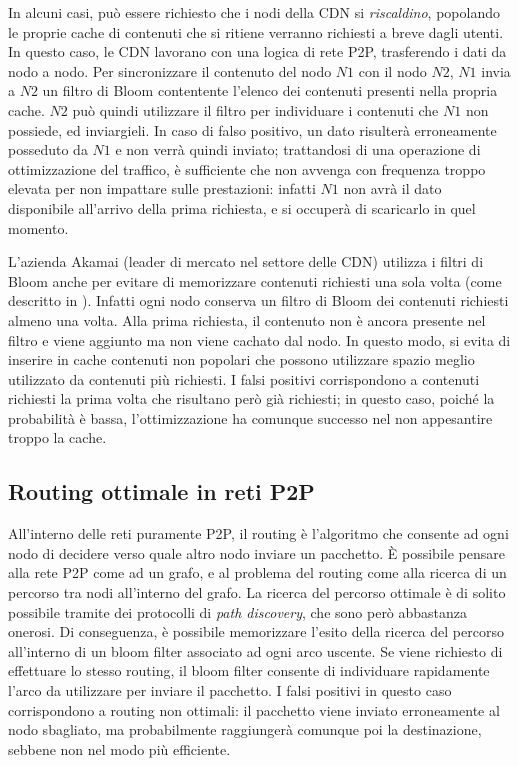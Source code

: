 In alcuni casi, può essere richiesto che i nodi della CDN si \emph{riscaldino}, popolando le
proprie cache di contenuti che si ritiene verranno richiesti a breve dagli utenti. In questo caso,
le CDN lavorano con una logica di rete P2P, trasferendo i dati da nodo a nodo. Per sincronizzare
il contenuto del nodo $N1$ con il nodo $N2$, $N1$ invia a $N2$ un filtro di Bloom contentente
l'elenco dei contenuti presenti nella propria cache. $N2$ può quindi utilizzare il filtro
per individuare i contenuti che $N1$ non possiede, ed inviargieli. In caso di falso positivo,
un dato risulterà erroneamente posseduto da $N1$ e non verrà quindi inviato; trattandosi di una
operazione di ottimizzazione del traffico, è sufficiente che non avvenga con frequenza troppo 
elevata per non impattare sulle prestazioni: infatti $N1$ non avrà il dato disponibile all'arrivo
della prima richiesta, e si occuperà di scaricarlo in quel momento. 

L'azienda Akamai (leader di mercato nel settore delle CDN) utilizza i filtri di Bloom anche per
evitare di memorizzare contenuti richiesti una sola volta (come descritto in \cite{bloomakamai}).
Infatti ogni nodo conserva un filtro di Bloom dei contenuti richiesti almeno una volta. Alla prima
richiesta, il contenuto non è ancora presente nel filtro e viene aggiunto ma non viene cachato
dal nodo. In questo modo, si evita di inserire in cache contenuti non popolari che possono 
utilizzare spazio meglio utilizzato da contenuti più richiesti. I falsi positivi corrispondono
a contenuti richiesti la prima volta che risultano però già richiesti; in questo caso, poiché
la probabilità è bassa, l'ottimizzazione ha comunque successo nel non appesantire troppo la cache.

\subsection{Routing ottimale in reti P2P}

All'interno delle reti puramente P2P, il routing è l'algoritmo che consente ad ogni nodo di
decidere verso quale altro nodo inviare un pacchetto. È possibile pensare alla rete P2P come
ad un grafo, e al problema del routing come alla ricerca di un percorso tra nodi all'interno
del grafo. La ricerca del percorso ottimale è di solito possibile tramite dei protocolli di 
\emph{path discovery}, che sono però abbastanza onerosi. Di conseguenza, è possibile memorizzare
l'esito della ricerca del percorso all'interno di un bloom filter associato ad ogni arco uscente.
Se viene richiesto di effettuare lo stesso routing, il bloom filter consente di individuare
rapidamente l'arco da utilizzare per inviare il pacchetto. I falsi positivi in questo caso
corrispondono a routing non ottimali: il pacchetto viene inviato erroneamente al nodo sbagliato,
ma probabilmente raggiungerà comunque poi la destinazione, sebbene non nel modo più efficiente. 

